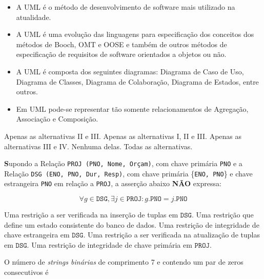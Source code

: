 \documentclass[12pt, addpoints]{exam}
\begin{document}
\begin{questions}
\begin{itemize}

    \item[I)] A UML é o método de desenvolvimento de software mais utilizado na atualidade.

    \item[II)] A UML é uma evolução das linguagens para especificação dos conceitos dos métodos de Booch, OMT e OOSE e também de outros métodos de especificação de requisitos de software orientados a objetos ou não.

    \item[III)] A UML é composta dos seguintes diagramas: Diagrama de Caso de Uso, Diagrama de Classes, Diagrama de Colaboração, Diagrama de Estados, entre outros.

    \item[IV)] Em UML pode-se representar tão somente relacionamentos de Agregação, Associação e Composição.

\end{itemize}
\begin{choices}
\choice Apenas as alternativas II e III.
\choice Apenas as alternativas I, II e III.
\choice Apenas as alternativas III e IV.
\choice Nenhuma delas.
\choice Todas as alternativas.
\end{choices}

\question

\textbf Supondo a Relação \texttt{PROJ (PNO, Nome, Orçam)}, com chave primária \texttt{PNO} e a Relação \texttt{DSG (ENO, PNO, Dur, Resp)}, com chave primária \{\texttt{ENO, PNO}\} e chave estrangeira \texttt{PNO} em relação a \texttt{PROJ}, a asserção abaixo \textbf{NÃO} expressa:



\begin{equation}\forall g \in \texttt{DSG}, \exists j \in \texttt{PROJ} : g.\texttt{PNO} = j.\texttt{PNO}\end{equation}
\begin{choices}
\choice Uma restrição a ser verificada na inserção de tuplas em $\texttt{DSG}$.
\choice Uma restrição que define um estado consistente do banco de dados.
\choice Uma restrição de integridade de chave estrangeira em $\texttt{DSG}$.
\choice Uma restrição a ser verificada na atualização de tuplas em $\texttt{DSG}$.
\choice Uma restrição de integridade de chave primária em $\texttt{PROJ}$.
\end{choices}

\question

O número de \textit{strings binárias} de comprimento 7 e contendo um par de zeros consecutivos é



\end{questions}
\end{document}

